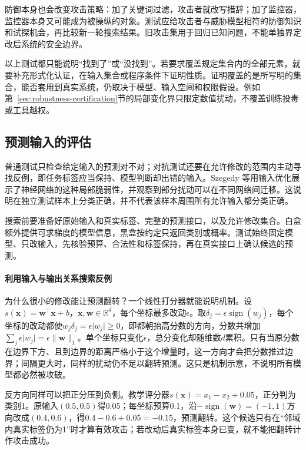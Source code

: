 防御本身也会改变攻击策略：加了关键词过滤，攻击者就改写措辞；加了监控器，监控器本身又可能成为被操纵的对象。测试应给攻击者与威胁模型相符的防御知识和试探机会，再比较新一轮搜索结果。旧攻击集用于回归已知问题，不能单独界定改后系统的安全边界。

以上测试都只能说明“找到了”或“没找到”。若要求覆盖规定集合内的全部元素，就要补充形式化认证，在输入集合或程序条件下证明性质。证明覆盖的是所写明的集合，能否套用到真实系统，仍取决于模型、输入空间和权限假设。例如第~\ref{sec:robustness-certification}节的局部变化界只限定数值扰动，不覆盖训练投毒或工具越权。

\subsection{预测输入的评估}
\label{sec:security-prediction-test}

普通测试只检查给定输入的预测对不对；对抗测试还要在允许修改的范围内主动寻找反例，即任务标签应当保持、模型判断却出错的输入。Szegedy 等用输入优化展示了神经网络的这种局部脆弱性，并观察到部分扰动可以在不同网络间迁移。这说明在独立测试样本上分类正确，并不代表该样本周围所有允许输入都分类正确。

搜索前要准备好原始输入和真实标签、完整的预测接口，以及允许修改集合。白盒额外提供可求梯度的模型信息，黑盒按约定只返回类别或概率。测试始终固定模型、只改输入，先核验预算、合法性和标签保持，再在真实接口上确认候选的预测。

\paragraph{利用输入与输出关系搜索反例}

为什么很小的修改能让预测翻转？一个线性打分器就能说明机制。设$s(\bm{x})=\bm{w}^\top\bm{x}+b$，$\bm x,\bm w\in\mathbb R^d$，每个坐标最多改动$\epsilon$。取$\delta_j=\epsilon\operatorname{sign}(w_j)$，每个坐标的改动都使$w_j\delta_j=\epsilon\lvert w_j\rvert\geq0$，即都朝抬高分数的方向，分数共增加$\sum_j\epsilon\lvert w_j\rvert=\epsilon\lVert\bm w\rVert_1$。单个坐标只变化$\epsilon$，总分变化却随维数$d$累积。只有当原分数在边界下方、且到边界的距离严格小于这个增量时，这一方向才会把分数推过边界；间隔更大时，同样的扰动仍不足以翻转预测。这只是机制示意，不说明所有模型都必然被攻破。

反方向同样可以把正分压到负侧。教学评分器$s(\bm{x})=x_1-x_2+0.05$，正分判为类别1。原输入$(0.5,0.5)$得0.05；每坐标预算0.1，沿$-\operatorname{sign}(\bm w)=(-1,1)$方向改成$(0.4,0.6)$，得$0.4-0.6+0.05=-0.15$，预测翻转。这个候选只有在“邻域内真实标签仍为1”时才算有效攻击；若改动后真实标签本身已变，就不能把翻转计作攻击成功。

